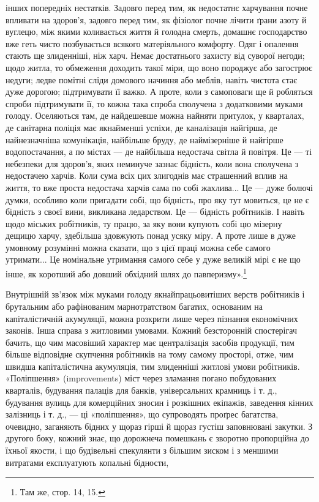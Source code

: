 інших попередніх нестатків. Задовго перед тим, як недостатнє
харчування почне впливати на здоров’я, задовго перед тим, як
фізіолог почне лічити ґрани азоту й вуглецю, між якими коливається
життя й голодна смерть, домашнє господарство вже геть
чисто позбувається всякого матеріяльного комфорту. Одяг і
опалення стають ще злиденніші, ніж харч. Немає достатнього
захисту від суворої негоди; щодо житла, то обмеження доходить
такої міри, що воно породжує або загострює недуги; ледве помітні
сліди домового начиння або меблів, навіть чистота стає
дуже дорогою; підтримувати її важко. А проте, коли з самоповаги
ще й робляться спроби підтримувати її, то кожна така спроба
сполучена з додатковими муками голоду. Оселяються там, де
найдешевше можна найняти притулок, у кварталах, де санітарна
поліція має якнайменші успіхи, де каналізація найгірша, де
найнезначніша комунікація, найбільше бруду, де наймізерніше
й найгірше водопостачання, а по містах — де найбільша недостача
світла й повітря. Це — ті небезпеки для здоров’я, яких
неминуче зазнає бідність, коли вона сполучена з недостачею харчів.
Коли сума всіх цих злигоднів має страшенний вплив на
життя, то вже проста недостача харчів сама по собі жахлива...
Це — дуже болючі думки, особливо коли пригадати собі, що
бідність, про яку тут мовиться, це не є бідність з своєї вини,
викликана ледарством. Це — бідність робітників. І навіть щодо
міських робітників, ту працю, за яку вони купують собі цю мізерну
дещицю харчу, здебільша здовжують понад усяку міру.
А проте лише в дуже умовному розумінні можна сказати, що
з цієї праці можна себе самого утримати... Це номінальне утримання
самого себе у дуже великій мірі є не що інше, як коротший
або довший обхідний шлях до павперизму».\footnote{
Там же, стор. 14, 15.
}

Внутрішній зв’язок між муками голоду якнайпрацьовитіших
верств робітників і брутальним або рафінованим марнотратством
багатих, основаним на капіталістичній акумуляції, можна
розкрити лише через пізнання економічних законів. Інша справа
з житловими умовами. Кожний безсторонній спостерігач бачить,
що чим масовіший характер має централізація засобів продукції,
тим більше відповідне скупчення робітників на тому самому
просторі, отже, чим швидша капіталістична акумуляція, тим
злиденніші житлові умови робітників. «Поліпшення» (improvements)
міст через зламання погано побудованих кварталів,
будування палаців для банків, універсальних крамниць і т. д.,
будування вулиць для комерційних зносин і розкішних екіпажів,
заведення кінних залізниць і т. д., — ці «поліпшення»,
що супроводять проґрес багатства, очевидно, заганяють бідних
у щораз гірші й щораз густіш заповнювані закутки. З другого
боку, кожний знає, що дорожнеча помешкань є зворотно пропорційна
до їхньої якости, і що будівельні спекулянти з більшим
зиском і з меншими витратами експлуатують копальні бідности,
